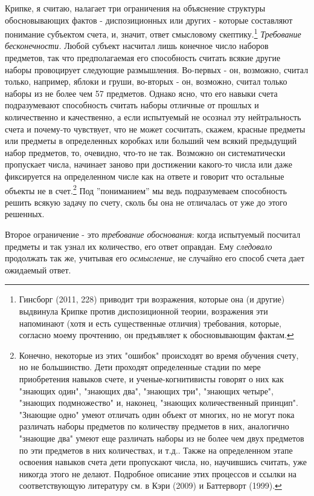 \documentclass{book}
\begin{document}
Крипке, я считаю, налагает три ограничения на объяснение структуры обосновывающих фактов - диспозиционных или других - которые составляют понимание субъектом счета, и, значит, ответ смысловому скептику.\footnote{Гинсборг (2011, 228) приводит три возражения, которые она (и другие) выдвинула Крипке против диспозиционной теории, возражения эти напоминают (хотя и есть существенные отличия) требования, которые, согласно моему прочтению, он предъявляет к обосновывающим фактам.} \textit{Требование бесконечности.} Любой субъект насчитал лишь конечное число наборов предметов, так что предполагаемая его способность считать всякие другие наборы провоцирует следующие размышления. Во-первых - он, возможно, считал только, например, яблоки и груши, во-вторых - он, возможно, считал только наборы из не более чем 57 предметов. Однако ясно, что его навыки счета подразумевают способность считать наборы отличные от прошлых и количественно и качественно, а если испытуемый не осознал эту нейтральность счета и почему-то чувствует, что не может сосчитать, скажем, красные предметы или предметы в определенных коробках или больший чем всякий предыдущий набор предметов, то, очевидно, что-то не так. Возможно он систематически пропускает числа, начинает заново при достижении какого-то числа или даже фиксируется на определенном числе как на ответе и говорит что остальные объекты не в счет.\footnote{Конечно, некоторые из этих "ошибок" происходят во время обучения счету, но не большинство. Дети проходят определенные стадии по мере приобретения навыков счете, и ученые-когнитивисты говорят о них как "знающих один", "знающих два", "знающих три", "знающих четыре", "знающих подмножество" и, наконец, "знающих количественный принцип". "Знающие одно" умеют отличать один объект от многих, но не могут пока различать наборы предметов по количеству предметов в них, аналогично "знающие два" умеют еще различать наборы из не более чем двух предметов по эти предметов в них количествах, и т.д.. Также на определенном этапе освоения навыков счета дети пропускают числа, но, научившись считать, уже никогда этого не делают. Подробное описание этих процессов и ссылки на соответствующую литературу см. в Кэри (2009) и Баттерворт (1999).} Под ''пониманием'' мы ведь подразумеваем способность решить всякую задачу по счету, сколь бы она не отличалась от уже до этого решенных.

Второе ограничение - это \textit{требование обоснования}: когда испытуемый посчитал предметы и так узнал их количество, его ответ оправдан. Ему \textit{следовало} продолжать так же, учитывая его \textit{осмысление}, не случайно его способ счета дает ожидаемый ответ.
\end{document}
